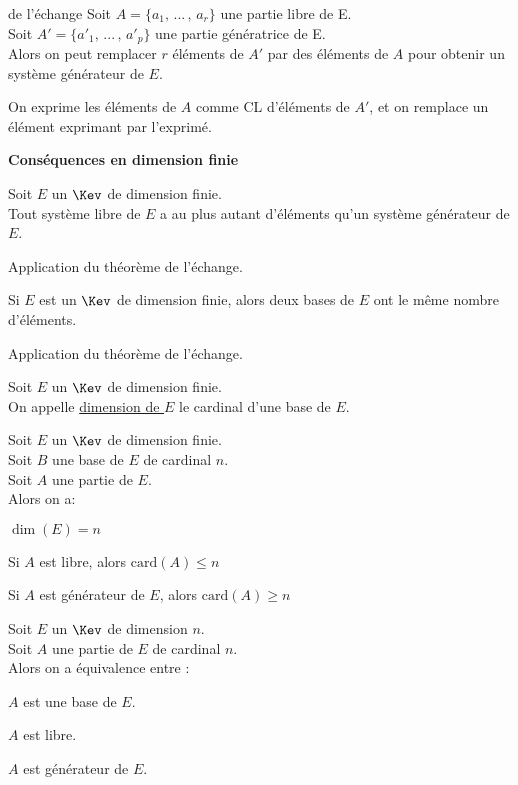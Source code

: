 \documentclass[12pt,twoside,a4paper]{article}
\begin{document}
	\begin{theo}{de l'\'echange}
		Soit $A=\{a_1,\,...\,,\,a_r\}$ une partie libre de E.\\
		Soit $A'=\{a'_1,\,...\,,\,a'_p\}$ une partie g\'en\'eratrice de E.\\
		Alors on peut remplacer $r$ \'el\'ements de $A'$ par des \'el\'ements de $A$ pour obtenir un syst\`eme g\'en\'erateur de $E$.
	\end{theo}
	\begin{preuve}
		On exprime les \'el\'ements de $A$ comme CL d'\'el\'ements de $A'$, et on remplace un \'el\'ement exprimant par l'exprim\'e.
	\end{preuve}
	\textbf{Cons\'equences en dimension finie}
	\begin{coro}
		Soit $E$ un $\Kev$ de dimension finie.\\
		Tout syst\`eme libre de $E$ a au plus autant d'\'el\'ements qu'un syst\`eme g\'en\'erateur de $E$.
	\end{coro}
	\begin{preuve}
		Application du th\'eor\`eme de l'\'echange.
	\end{preuve}
	\begin{coro}
		Si $E$ est un $\Kev$ de dimension finie, alors deux bases de $E$ ont le m\^eme nombre d'\'el\'ements.
	\end{coro}
	\begin{preuve}
		Application du th\'eor\`eme de l'\'echange.
	\end{preuve}
	\begin{defi}
		Soit $E$ un $\Kev$ de dimension finie.\\
		On appelle \underline{dimension de $E$} le cardinal d'une base de $E$.
	\end{defi}
	\begin{coro}
		Soit $E$ un $\Kev$ de dimension finie.\\
		Soit $B$ une base de $E$ de cardinal $n$.\\
		Soit $A$ une partie de $E$.\\
		Alors on a:
		\begin{liste}
			\item $\dim(E)=n$
			\item Si $A$ est libre, alors $\mathrm{card}(A)\leqslant n$
			\item Si $A$ est g\'en\'erateur de $E$, alors $\mathrm{card}(A)\geqslant n$
		\end{liste}
	\end{coro}
	\begin{coro}
		Soit $E$ un $\Kev$ de dimension $n$.\\
		Soit $A$ une partie de $E$ de cardinal $n$.\\
		Alors on a \'equivalence entre :
		\begin{liste}
			\item $A$ est une base de $E$.
			\item $A$ est libre.
			\item $A$ est g\'en\'erateur de $E$.
		\end{liste}
	\end{coro}
\end{document}
